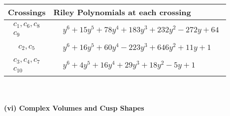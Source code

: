 \documentclass[1p]{elsarticle_modified}
\theoremstyle{definition}
\begin{document}
\begin{tabular}{m{50pt}|m{274pt}}
Crossings & \hspace{64pt}Riley Polynomials at each crossing \\
\hline $$\begin{aligned}c_{1},c_{6},c_{8}\\c_{9}\end{aligned}$$&$\begin{aligned}
&y^6+15 y^5+78 y^4+183 y^3+232 y^2-272 y+64
\end{aligned}$\\
\hline $$\begin{aligned}c_{2},c_{5}\end{aligned}$$&$\begin{aligned}
&y^6+16 y^5+60 y^4-223 y^3+646 y^2+11 y+1
\end{aligned}$\\
\hline $$\begin{aligned}c_{3},c_{4},c_{7}\\c_{10}\end{aligned}$$&$\begin{aligned}
&y^6+4 y^5+16 y^4+29 y^3+18 y^2-5 y+1
\end{aligned}$\\
\hline
\end{tabular}\\~\\
\newpage\flushleft \textbf{(vi) Complex Volumes and Cusp Shapes}
\end{document}

